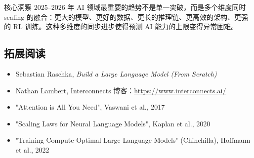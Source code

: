 \documentclass[a4paper]{article}
\begin{document}
\begin{importantbox}{核心洞察}
2025--2026 年 AI 领域最重要的趋势不是单一突破，而是多个维度同时 scaling 的融合：更大的模型、更好的数据、更长的推理链、更高效的架构、更强的 RL 训练。这种多维度的同步进步使得预测 AI 能力的上限变得异常困难。
\end{importantbox}

\subsection{拓展阅读}

\begin{itemize}
    \item Sebastian Raschka, \textit{Build a Large Language Model (From Scratch)}
    \item Nathan Lambert, Interconnects 博客：\url{https://www.interconnects.ai/}
    \item "Attention is All You Need", Vaswani et al., 2017
    \item "Scaling Laws for Neural Language Models", Kaplan et al., 2020
    \item "Training Compute-Optimal Large Language Models" (Chinchilla), Hoffmann et al., 2022
\end{itemize}

\end{document}

